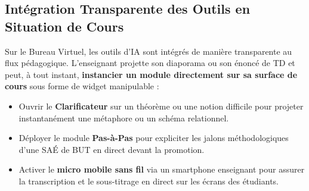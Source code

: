 \documentclass[11pt,a4paper]{article}
\begin{document}
\begin{center}
\end{center}
\vspace{0.4cm}

\subsection{Intégration Transparente des Outils en Situation de Cours}
Sur le Bureau Virtuel, les outils d'IA sont intégrés de manière transparente au flux pédagogique. L'enseignant projette son diaporama ou son énoncé de TD et peut, à tout instant, \textbf{instancier un module directement sur sa surface de cours} sous forme de widget manipulable :
\begin{itemize}[leftmargin=1.5em, itemsep=2pt]
    \item Ouvrir le \textbf{Clarificateur} sur un théorème ou une notion difficile pour projeter instantanément une métaphore ou un schéma relationnel.
    \item Déployer le module \textbf{Pas-à-Pas} pour expliciter les jalons méthodologiques d'une SAÉ de BUT en direct devant la promotion.
    \item Activer le \textbf{micro mobile sans fil} via un smartphone enseignant pour assurer la transcription et le sous-titrage en direct sur les écrans des étudiants.
\end{itemize}
\end{document}
